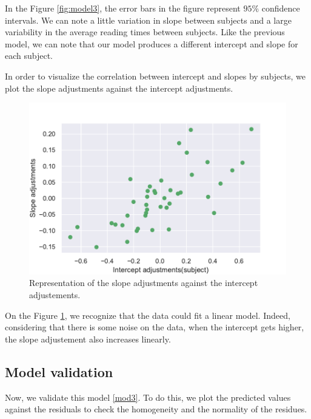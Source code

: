\documentclass{article}
\begin{document}
In the Figure \ref{fig:model3}, the error bars in the figure represent $95\%$ confidence intervals. We can note a little variation in slope between subjects and  a large variability in the average reading times between subjects. Like the previous model, we can note that our model produces a different intercept and slope for each subject. 

In order to visualize the correlation between intercept and slopes by subjects, we plot the slope adjustments against the intercept adjustments.
\begin{figure}[H]
    \centering
    \includegraphics[scale=.65]{./images/adj_so_inter.pdf}
    \caption{Representation of the slope adjustments against the intercept adjustements.}
    \label{fig:adj_slope}
\end{figure}

On the Figure \ref{fig:adj_slope}, we recognize that the data could fit a linear model. Indeed, considering that there is some noise on the data, when the intercept gets higher, the slope adjustement also increases linearly. 

\subsection{Model validation}
Now, we validate this model \eqref{mod3}. To do this, we plot the predicted values against the residuals to check the homogeneity and the normality of the residues.
\end{document}
